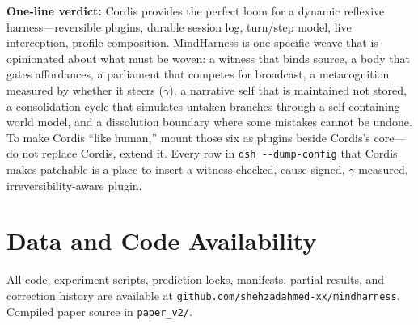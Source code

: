 \documentclass[11pt]{article}
\begin{document}
\noindent\textbf{One-line verdict:} Cordis provides the perfect loom for a dynamic
reflexive harness---reversible plugins, durable session log, turn/step model,
live interception, profile composition. MindHarness is one specific weave that
is opinionated about what must be woven: a witness that binds source, a body
that gates affordances, a parliament that competes for broadcast, a
metacognition measured by whether it steers ($\gamma$), a narrative self that is
maintained not stored, a consolidation cycle that simulates untaken branches
through a self-containing world model, and a dissolution boundary where some
mistakes cannot be undone. To make Cordis ``like human,'' mount those six as
plugins beside Cordis's core---do not replace Cordis, extend it. Every row in
\texttt{dsh -\allowbreak{}-\allowbreak{}dump-\allowbreak{}config} that Cordis makes patchable is a place to insert a
witness-checked, cause-signed, $\gamma$-measured, irreversibility-aware plugin.

\section*{Data and Code Availability}
All code, experiment scripts, prediction locks, manifests, partial
results, and correction history are available at
\texttt{github.com/\allowbreak{}shehzadahmed-\allowbreak{}xx/\allowbreak{}mindharness}. Compiled paper source in
\texttt{paper\_v2/}.
\end{document}
